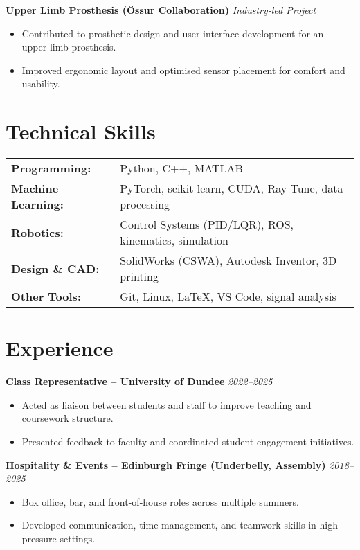 \documentclass[a4paper,11pt]{article}
\begin{document}
\textbf{Upper Limb Prosthesis (Össur Collaboration)} \hfill \textit{Industry-led Project}\\
\begin{itemize}
    \item Contributed to prosthetic design and user-interface development for an upper-limb prosthesis.
    \item Improved ergonomic layout and optimised sensor placement for comfort and usability.
\end{itemize}

\section*{Technical Skills}

\begin{tabular}{@{}ll}
\textbf{Programming:} & Python, C++, MATLAB \\
\textbf{Machine Learning:} & PyTorch, scikit-learn, CUDA, Ray Tune, data processing \\
\textbf{Robotics:} & Control Systems (PID/LQR), ROS, kinematics, simulation \\
\textbf{Design \& CAD:} & SolidWorks (CSWA), Autodesk Inventor, 3D printing \\
\textbf{Other Tools:} & Git, Linux, LaTeX, VS Code, signal analysis
\end{tabular}

\section*{Experience}

\textbf{Class Representative – University of Dundee} \hfill \textit{2022–2025}
\begin{itemize}
    \item Acted as liaison between students and staff to improve teaching and coursework structure.
    \item Presented feedback to faculty and coordinated student engagement initiatives.
\end{itemize}

\textbf{Hospitality \& Events – Edinburgh Fringe (Underbelly, Assembly)} \hfill \textit{2018–2025}
\begin{itemize}
    \item Box office, bar, and front-of-house roles across multiple summers.
    \item Developed communication, time management, and teamwork skills in high-pressure settings.
\end{itemize}
\end{document}
